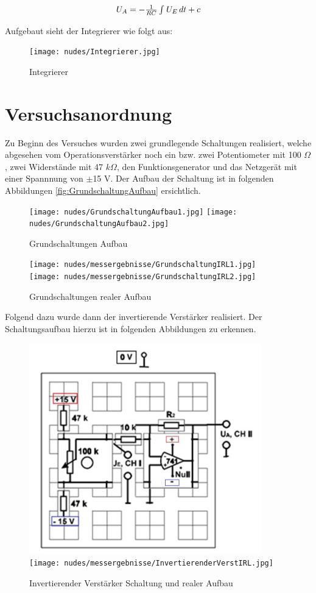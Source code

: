 \documentclass[12pt,a4paper,twoside]{article}
\begin{document}
\begin{equation}
    \label{eq:IntegriererAusgang}
    \centerline{$U_{A}=-\frac{1}{RC} \int_{}^{} U_{E} \,dt + c $}
\end{equation}

\noindent
Aufgebaut sieht der Integrierer wie folgt aus:

\begin{figure}[H]
    \centering
    \texttt{[image: nudes/Integrierer.jpg]}
    \caption{Integrierer \cite{teachcenter2}}
    \label{fig:Integrierer}
\end{figure}


\section{Versuchsanordnung} %

Zu Beginn des Versuches wurden zwei grundlegende Schaltungen realisiert, welche abgesehen vom Operationsverstärker noch ein bzw. zwei Potentiometer mit 100 $\Omega$, zwei Widerstände mit 47 $k \Omega$, den Funktionsgenerator und das Netzgerät mit einer Spannnung von $\pm$15 V. Der Aufbau der Schaltung ist in folgenden Abbildungen \ref{fig:GrundschaltungAufbau} ersichtlich.

\begin{figure}[H]
    \centering
    \texttt{[image: nudes/GrundschaltungAufbau1.jpg]}
    \texttt{[image: nudes/GrundschaltungAufbau2.jpg]}
    \caption{Grundschaltungen Aufbau \cite{teachcenter2}}
    \label{fig:GrundschaltungenAufbau}
\end{figure}

\begin{figure}[H]
    \centering
    \texttt{[image: nudes/messergebnisse/GrundschaltungIRL1.jpg]}
    \texttt{[image: nudes/messergebnisse/GrundschaltungIRL2.jpg]}
    \caption{Grundschaltungen realer Aufbau}
    \label{fig:GrundschaltungenAufbauIRL}
\end{figure}

\noindent
Folgend dazu wurde dann der invertierende Verstärker realisiert. Der Schaltungsaufbau hierzu ist in folgenden Abbildungen zu erkennen.

\begin{figure}[H]
    \centering
    \includegraphics[width=0.4\linewidth]{nudes/InvertierenderVerstärkerSchaltungAufbau.jpg}
    \texttt{[image: nudes/messergebnisse/InvertierenderVerstIRL.jpg]}
    \caption{Invertierender Verstärker Schaltung und realer Aufbau \cite{teachcenter2}}
    \label{fig:SchaltungInvertierenderVerstärker}
\end{figure}
\end{document}
